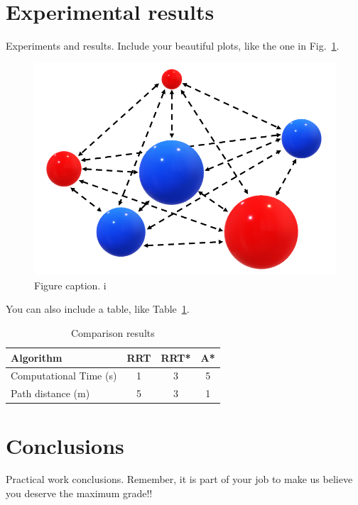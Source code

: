 \documentclass[letterpaper, 10 pt, conference]{ieeeconf}
\begin{document}

\section{Experimental results}\label{sec:experiments}
Experiments and results.
Include your beautiful plots, like the one in Fig.~\ref{fig:fig1}.
\begin{figure}[!ht]
    \centering
    \includegraphics[width=0.35\columnwidth]{images/Nbody.png}
    \caption{Figure caption.
i}
    \label{fig:fig1}
\end{figure}

You can also include a table, like Table~\ref{table:table1}.
\begin{table}[H]%
\centering
\footnotesize
\begin{tabular}{|p{3.9cm}|c|c|c|}
\hline
\textbf{Algorithm} & RRT & RRT* & A*\\
\hline
Computational Time (s) & 1 & 3 & 5 \\
Path distance (m)      & 5 & 3 & 1 \\
\hline
\end{tabular}
\caption{Comparison results}
\label{table:table1}
\end{table}


\section{Conclusions}\label{sec:conclusion}
Practical work conclusions. Remember, it is part of your job to make us believe you deserve the maximum grade!!





\end{document}
